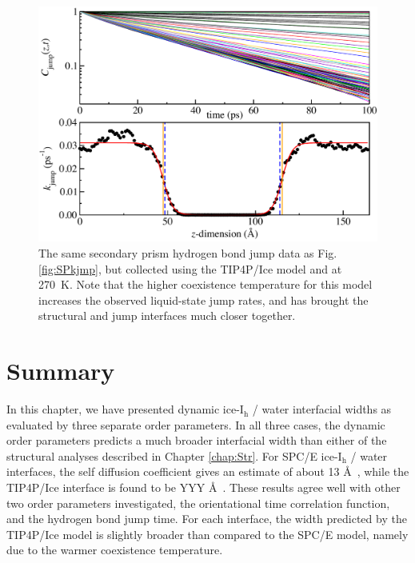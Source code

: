 \begin{figure}
\includegraphics[width=\linewidth]{Figures/secprismJumpPlotTIP4PIce}
\caption{\label{fig:SPTIP4Pkjmp} The same secondary prism hydrogen
  bond jump data as Fig. \ref{fig:SPkjmp}, but collected using the
  TIP4P/Ice model and at 270~K.  Note that the higher coexistence
  temperature for this model increases the observed liquid-state jump
  rates, and has brought the structural and jump interfaces much
  closer together.}
\end{figure}


\section{Summary}
In this chapter, we have presented dynamic ice-I$_\mathrm{h}$ / water
interfacial widths as evaluated by three separate order parameters. In
all three cases, the dynamic order parameters predicts a much broader
interfacial width than either of the structural analyses described in
Chapter \ref{chap:Str}.  For SPC/E ice-I$_\mathrm{h}$ / water
interfaces, the self diffusion coefficient gives an estimate of about
13 \AA~, while the TIP4P/Ice interface is found to be YYY \AA~. These
results agree well with other two order parameters investigated, the
orientational time correlation function, and the hydrogen bond jump
time. For each interface, the width predicted by the TIP4P/Ice model
is slightly broader than compared to the SPC/E model, namely due to
the warmer coexistence temperature. 

